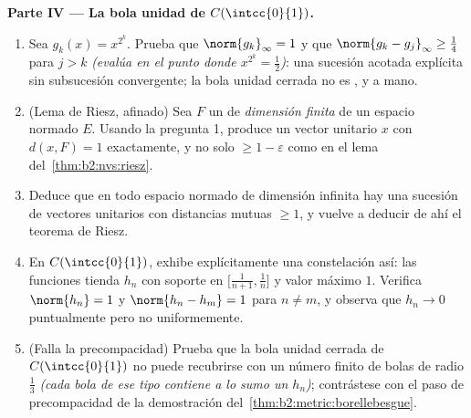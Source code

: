 \begin{problem}
\medskip
\noindent\textbf{Parte IV --- La bola unidad de
$C(\intcc{0}{1})$.}
\begin{enumerate}[resume]
  \item Sea $g_k(x) = x^{2^k}$. Prueba que $\norm{g_k}_\infty = 1$ y
        que $\norm{g_k - g_j}_\infty \geq \frac14$ para $j > k$
        \emph{(evalúa en el punto donde $x^{2^k} = \frac12$)}: una
        sucesión acotada explícita sin subsucesión convergente; la
        bola unidad cerrada no es , y a mano.
  \item (Lema de Riesz, afinado) Sea $F$ un  de
        \emph{dimensión finita} de un espacio normado $E$. Usando la
        pregunta 1, produce un vector unitario $x$ con $d(x, F) = 1$
        exactamente, y no solo $\geq 1 - \varepsilon$ como en el
        lema del~\cref{thm:b2:nvs:riesz}.
  \item Deduce que en todo espacio normado de dimensión infinita hay
        una sucesión de vectores unitarios con distancias mutuas
        $\geq 1$, y vuelve a deducir de ahí el teorema de Riesz.
  \item En $C(\intcc{0}{1})$, exhibe explícitamente una
        constelación así: las funciones tienda $h_n$ con soporte en
        $\bigl[\frac1{n+1}, \frac1n\bigr]$ y valor máximo $1$.
        Verifica $\norm{h_n} = 1$ y $\norm{h_n - h_m} = 1$ para $n
        \neq m$, y observa que $h_n \to 0$ puntualmente pero no
        uniformemente.
  \item (Falla la precompacidad) Prueba que la bola unidad cerrada
        de $C(\intcc{0}{1})$ no puede recubrirse con un número
        finito de bolas de radio $\frac13$ \emph{(cada bola de ese
        tipo contiene a lo sumo un $h_n$)}; contrástese con el paso
        de precompacidad de la demostración del~\cref{thm:b2:metric:borellebesgue}.
\end{enumerate}


\end{problem}
